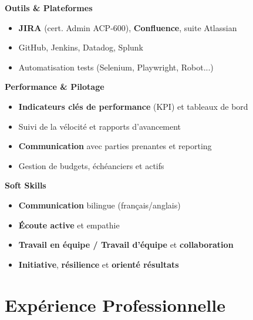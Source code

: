 \documentclass[11pt,a4paper]{article}
\newcommand{\highlight}[1]{\textcolor{primaryblue}{\textbf{#1}}}
\newcommand{\skilltitle}[1]{\normalsize\textcolor{primaryblue}{\textbf{#1}}}
\begin{document}
\begin{minipage}[t]{0.42\textwidth}
\skilltitle{Outils \& Plateformes}
\begin{itemize}[leftmargin=10pt]
    \item \highlight{JIRA} (cert. Admin ACP-600), \highlight{Confluence}, suite Atlassian
    \item GitHub, Jenkins, Datadog, Splunk
    \item Automatisation tests (Selenium, Playwright, Robot...)
\end{itemize}

\skilltitle{Performance \& Pilotage}
\begin{itemize}[leftmargin=10pt]
    \item \highlight{Indicateurs clés de performance} (KPI) et tableaux de bord
    \item Suivi de la vélocité et rapports d'avancement
    \item \highlight{Communication} avec parties prenantes et reporting
    \item Gestion de budgets, échéanciers et actifs
\end{itemize}

\skilltitle{Soft Skills}
\begin{itemize}[leftmargin=10pt]
    \item \highlight{Communication} bilingue (français/anglais)
    \item \highlight{Écoute active} et empathie
    \item \highlight{Travail en équipe / Travail d'équipe} et \highlight{collaboration}
    \item \highlight{Initiative}, \highlight{résilience} et \highlight{orienté résultats}
\end{itemize}
\end{minipage}


\section*{Expérience Professionnelle}
\end{document}
